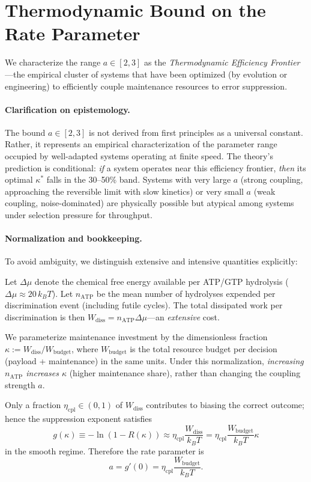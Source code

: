 \documentclass[11pt,twocolumn]{article}
\begin{document}
\section{Thermodynamic Bound on the Rate Parameter}
\label{app:dissipation}

We characterize the range $a \in [2, 3]$ as the \emph{Thermodynamic Efficiency Frontier}---the empirical cluster of systems that have been optimized (by evolution or engineering) to efficiently couple maintenance resources to error suppression.

\paragraph{Clarification on epistemology.} The bound $a \in [2, 3]$ is not derived from first principles as a universal constant. Rather, it represents an empirical characterization of the parameter range occupied by well-adapted systems operating at finite speed. The theory's prediction is conditional: \emph{if} a system operates near this efficiency frontier, \emph{then} its optimal $\kappa^*$ falls in the 30--50\% band. Systems with very large $a$ (strong coupling, approaching the reversible limit with slow kinetics) or very small $a$ (weak coupling, noise-dominated) are physically possible but atypical among systems under selection pressure for throughput.

\paragraph{Normalization and bookkeeping.} To avoid ambiguity, we distinguish extensive and intensive quantities explicitly:

Let $\Delta\mu$ denote the chemical free energy available per ATP/GTP hydrolysis ($\Delta\mu \approx 20\, k_B T$). Let $n_{\mathrm{ATP}}$ be the mean number of hydrolyses expended per discrimination event (including futile cycles). The total dissipated work per discrimination is then $W_{\mathrm{diss}} = n_{\mathrm{ATP}} \Delta\mu$---an \emph{extensive} cost.

We parameterize maintenance investment by the dimensionless fraction $\kappa := W_{\mathrm{diss}} / W_{\mathrm{budget}}$, where $W_{\mathrm{budget}}$ is the total resource budget per decision (payload + maintenance) in the same units. Under this normalization, \emph{increasing $n_{\mathrm{ATP}}$ increases $\kappa$} (higher maintenance share), rather than changing the coupling strength $a$.

Only a fraction $\eta_{\mathrm{cpl}} \in (0,1)$ of $W_{\mathrm{diss}}$ contributes to biasing the correct outcome; hence the suppression exponent satisfies
\begin{equation}
g(\kappa) \equiv -\ln(1 - R(\kappa)) \approx \eta_{\mathrm{cpl}} \frac{W_{\mathrm{diss}}}{k_B T} = \eta_{\mathrm{cpl}} \frac{W_{\mathrm{budget}}}{k_B T} \kappa
\end{equation}
in the smooth regime. Therefore the rate parameter is
\begin{equation}
a = g'(0) = \eta_{\mathrm{cpl}} \frac{W_{\mathrm{budget}}}{k_B T}.
\label{eq:a_empirical}
\end{equation}
\end{document}
